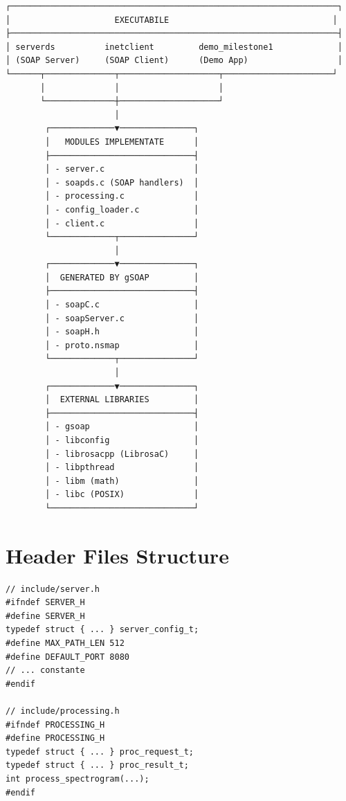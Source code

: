 \documentclass[12pt,a4paper,twoside]{article}
\begin{document}
\begin{itemize}
\begin{verbatim}
┌──────────────────────────────────────────────────────────────────┐
│                     EXECUTABILE                                 │
├──────────────────────────────────────────────────────────────────┤
│ serverds          inetclient         demo_milestone1             │
│ (SOAP Server)     (SOAP Client)      (Demo App)                  │
└──────┬──────────────┬────────────────────┬──────────────────────┘
       │              │                    │
       └──────────────┼────────────────────┘
                      │
        ┌─────────────▼───────────────┐
        │   MODULES IMPLEMENTATE      │
        ├─────────────────────────────┤
        │ - server.c                  │
        │ - soapds.c (SOAP handlers)  │
        │ - processing.c              │
        │ - config_loader.c           │
        │ - client.c                  │
        └─────────────┬───────────────┘
                      │
        ┌─────────────▼───────────────┐
        │  GENERATED BY gSOAP         │
        ├─────────────────────────────┤
        │ - soapC.c                   │
        │ - soapServer.c              │
        │ - soapH.h                   │
        │ - proto.nsmap               │
        └─────────────┬───────────────┘
                      │
        ┌─────────────▼───────────────┐
        │  EXTERNAL LIBRARIES         │
        ├─────────────────────────────┤
        │ - gsoap                     │
        │ - libconfig                 │
        │ - librosacpp (LibrosaC)     │
        │ - libpthread                │
        │ - libm (math)               │
        │ - libc (POSIX)              │
        └─────────────────────────────┘
\end{verbatim}

\section{Header Files Structure}

\begin{lstlisting}
// include/server.h
#ifndef SERVER_H
#define SERVER_H
typedef struct { ... } server_config_t;
#define MAX_PATH_LEN 512
#define DEFAULT_PORT 8080
// ... constante
#endif

// include/processing.h
#ifndef PROCESSING_H
#define PROCESSING_H
typedef struct { ... } proc_request_t;
typedef struct { ... } proc_result_t;
int process_spectrogram(...);
#endif


\end{lstlisting}
\end{itemize}
\end{document}
